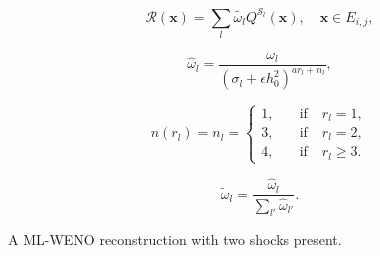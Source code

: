 \documentclass[usenames,dvipsnames,letterpaper,landscape,final]{slides}
\theoremstyle{definition}
\begin{document}
\begin{myslide}
		  \begin{center}
		  \end{center}
		  \parbox{0.4\textwidth}{\raggedright
		  \begin{equation*}\label{eq:reconstruction}
\mathcal{R}(\mathbf{x}) = \sum_{l} \tilde{\omega_l} Q^{\mathcal{S}_l}(\mathbf{x}), \quad \mathbf{x} \in E_{i,j},
		  \end{equation*}

		  \begin{equation*}\label{eq:nonlinearwgts}
\hat{\omega}_l = \frac{\omega_l}{(\sigma_l + \epsilon h_0^2)^{ar_l + n_l}},
		  \end{equation*}

		  \begin{equation*}\label{eq:biasingfctor}
n(r_l) = n_l = \begin{cases}
1, \quad &\text{if} \quad r_l = 1,\\
3, \quad &\text{if} \quad r_l = 2,\\
4, \quad &\text{if} \quad r_l \geq 3.
\end{cases}
		  \end{equation*}

		  \begin{equation*}\label{eq:normalizednonlinearwgts}
\tilde{\omega}_l = \frac{\hat{\omega}_l}{\sum_{l'} \hat{\omega}_{l'}}.
		  \end{equation*}
		  }\parbox{0.6\textwidth}{
\centering


		  A  ML-WENO reconstruction with two shocks present.

		  }
\end{myslide}
\end{document}
